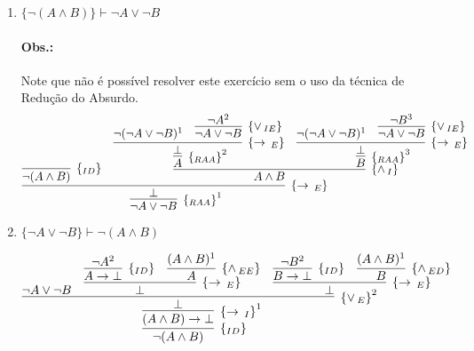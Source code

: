 \begin{enumerate}
\begin{enumerate}
	\item $\{\neg(A \land B)\}\vdash \neg A \lor \neg B$ 
	\paragraph*{Obs.:}Note que n\~ao \'e poss\'ivel resolver este exerc\'icio sem o uso da t\'ecnica de Redu\c{c}\~ao do Absurdo.
	\[
		\infer[\raa^1]
			{\neg A \lor \neg B}
			{
				\infer[\impE]
					{\bot}
					{
					\infer[\Id]
						{\neg(A \land B)}
						{}
					 &	
					 \infer[\andI]
					 	{A \land B}
					 	{
					 		\infer[\raa^2]
					 			{A}
					 			{
					 				\infer[\impE]
					 					{\bot}
					 					{
					 						\neg(\neg A \lor \neg B)^1
					 						&
					 						\infer[\orIE]
					 							{\neg A \lor \neg B}
					 							{
					 							 \neg A^2
					 							}
					 					}
					 			}
					 		&
					 		\infer[\raa^3]
					 			{B}
					 			{
					 				\infer[\impE]
					 					{\bot}
					 					{			 						\neg(\neg A \lor \neg B)^1
											&   						\infer[\orIE]						{\neg A \lor \neg B}												 										 																		 {\neg B^3}	
						 			}
					 			}	
					 	}
					}
			}
	\]
	
	

	\item $\{\neg A \lor \neg B\}\vdash \neg (A\land B)$
	
	\[
		\infer[\Id]
			{\neg (A \land B)}
			{
				\infer[\impI^1]
					{(A \land B) \to \bot}	
					{
						\infer[\orE^2]
							{\bot}
							{
								\neg A \lor \neg B
								&
									\infer[\impE]
										{\bot}
										{
											\infer[\Id]
												{A \to \bot}
												{\neg A^2}
										&
											\infer[\andEE]
												{A}
												{(A \land B)^1}
										}
								&
									\infer[\impE]
										{\bot}
										{
											\infer[\Id]
												{B \to \bot}
												{\neg B^2}
										&
											\infer[\andED]
												{B}
												{(A \land B)^1}
										}
							}
					}
			}
	\]
	\end{enumerate}
	

\end{enumerate}
